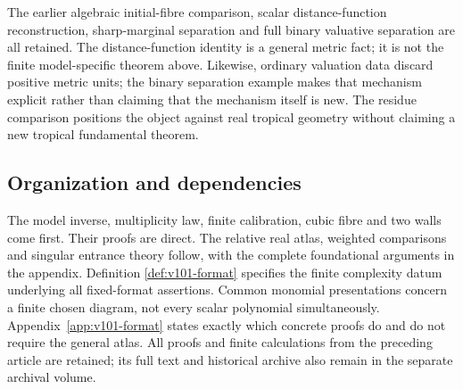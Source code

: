 The earlier algebraic initial-fibre comparison, scalar distance-function
reconstruction, sharp-marginal separation and full binary valuative
separation are all retained. The distance-function identity is a general
metric fact; it is not the finite model-specific theorem above.
Likewise, ordinary valuation data discard positive metric units; the
binary separation example makes that mechanism explicit rather than
claiming that the mechanism itself is new. The residue comparison
positions the object against real tropical geometry without claiming
a new tropical fundamental theorem.

\subsection*{Organization and dependencies}
The model inverse, multiplicity law, finite calibration, cubic fibre and
two walls come first. Their proofs are direct. The relative real atlas,
weighted comparisons and singular entrance theory follow, with the
complete foundational arguments in the appendix. Definition
\ref{def:v101-format} specifies the finite complexity datum underlying
all fixed-format assertions. Common monomial presentations concern a
finite chosen diagram, not every scalar polynomial simultaneously.
Appendix~\ref{app:v101-format} states exactly which concrete proofs do
and do not require the general atlas. All proofs and finite calculations
from the preceding article are retained; its full text and historical
archive also remain in the separate archival volume.
















\appendix



\let\AOriginalEndBibliography\endthebibliography
\renewcommand{\endthebibliography}{\AOriginalEndBibliography}


